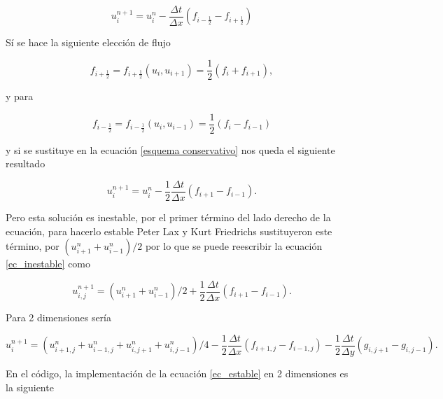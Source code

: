 \documentclass[12pt,a4paper]{book}
\begin{document}
\begin{equation}\label{esquema conservativo}
u_i^{n+1} = u_i^{n} -\frac{\Delta t}{\Delta x} \left(f_{i-\frac{1}{2}} - f_{i+\frac{1}{2}}\right)
\end{equation}



\noindent Sí se hace la siguiente elección de flujo 

\begin{equation}
f_{i+\frac{1}{2}} = f_{i+\frac{1}{2}} \left(
u_{i} , u_{i+1}\right) =\frac{1}{2} \left(f_{i} + f_{i+1} \right), 
\end{equation}

\noindent y para 

\begin{equation}
f_{i-\frac{1}{2}} = f_{i-\frac{1}{2}} \left(
u_{i} , u_{i-1}\right) =\frac{1}{2} \left(f_{i} - f_{i-1} \right) 
\end{equation}

\noindent y si se sustituye en la ecuación \ref{esquema conservativo} nos queda el siguiente resultado

\begin{equation}\label{ec_inestable}
u_i^{n+1} = u_i^{n} - \frac{1}{2}\frac{\Delta t}{\Delta x} \left(f_{i+1} - f_{i-1} \right).
\end{equation}

\noindent Pero esta solución es inestable, por el primer término del lado derecho de la ecuación, para hacerlo estable Peter Lax y Kurt Friedrichs sustituyeron este término, por $(u_{i+1}^n+u_{i-1}^n)/2$  por lo que se puede
reescribir la ecuación \ref{ec_inestable} como

\begin{equation}\label{ec_estable}
  u_{i,j}^{n+1} =(u_{i+1}^n+u_{i-1}^n)/2 + \frac{1}{2}\frac{\Delta t}{\Delta x} \left(f_{i+1} - f_{i-1} \right).
\end{equation}

\noindent Para 2 dimensiones sería

\begin{equation}\label{ec_estable_2D}
  u_i^{n+1} =(u_{i+1,j}^n+u_{i-1,j}^n+u_{i,j+1}^n+u_{i,j-1}^n)/4 - \frac{1}{2}\frac{\Delta t}{\Delta x} \left(f_{i+1,j} - f_{i-1,j} \right)-\frac{1}{2}\frac{\Delta t}{\Delta y} \left(g_{i,j+1} - g_{i,j-1} \right).
\end{equation}

En el código, la implementación de la ecuación \ref{ec_estable} en 2 dimensiones es la siguiente
\end{document}
